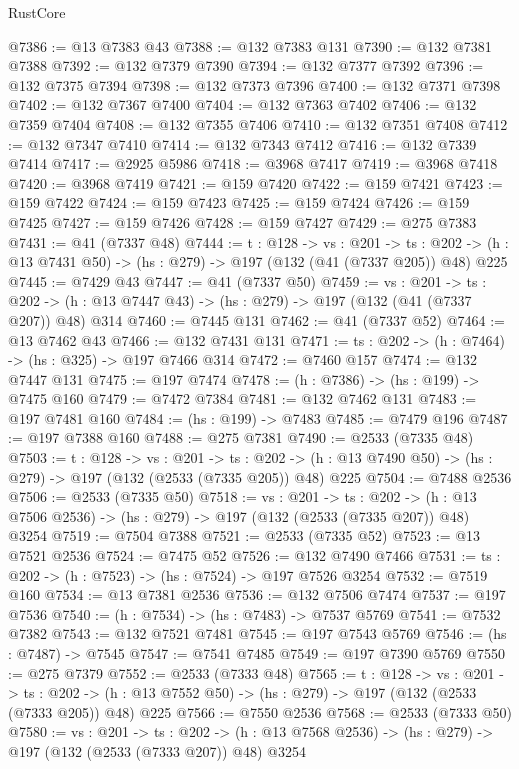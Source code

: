 \begin{lexlean}{RustCore}
\begin{coremodule}
@7386 := @13 @7383 @43
@7388 := @132 @7383 @131
@7390 := @132 @7381 @7388
@7392 := @132 @7379 @7390
@7394 := @132 @7377 @7392
@7396 := @132 @7375 @7394
@7398 := @132 @7373 @7396
@7400 := @132 @7371 @7398
@7402 := @132 @7367 @7400
@7404 := @132 @7363 @7402
@7406 := @132 @7359 @7404
@7408 := @132 @7355 @7406
@7410 := @132 @7351 @7408
@7412 := @132 @7347 @7410
@7414 := @132 @7343 @7412
@7416 := @132 @7339 @7414
@7417 := @2925 @5986
@7418 := @3968 @7417
@7419 := @3968 @7418
@7420 := @3968 @7419
@7421 := @159 @7420
@7422 := @159 @7421
@7423 := @159 @7422
@7424 := @159 @7423
@7425 := @159 @7424
@7426 := @159 @7425
@7427 := @159 @7426
@7428 := @159 @7427
@7429 := @275 @7383
@7431 := @41 (@7337 @48)
@7444 := {t : @128} ->
  {vs : @201} ->
  {ts : @202} -> (h : @13 @7431 @50) -> (hs : @279) -> @197 (@132 (@41 (@7337 @205)) @48) @225
@7445 := @7429 @43
@7447 := @41 (@7337 @50)
@7459 := {vs : @201} ->
  {ts : @202} -> (h : @13 @7447 @43) -> (hs : @279) -> @197 (@132 (@41 (@7337 @207)) @48) @314
@7460 := @7445 @131
@7462 := @41 (@7337 @52)
@7464 := @13 @7462 @43
@7466 := @132 @7431 @131
@7471 := {ts : @202} -> (h : @7464) -> (hs : @325) -> @197 @7466 @314
@7472 := @7460 @157
@7474 := @132 @7447 @131
@7475 := @197 @7474
@7478 := (h : @7386) -> (hs : @199) -> @7475 @160
@7479 := @7472 @7384
@7481 := @132 @7462 @131
@7483 := @197 @7481 @160
@7484 := (hs : @199) -> @7483
@7485 := @7479 @196
@7487 := @197 @7388 @160
@7488 := @275 @7381
@7490 := @2533 (@7335 @48)
@7503 := {t : @128} ->
  {vs : @201} ->
  {ts : @202} -> (h : @13 @7490 @50) -> (hs : @279) -> @197 (@132 (@2533 (@7335 @205)) @48) @225
@7504 := @7488 @2536
@7506 := @2533 (@7335 @50)
@7518 := {vs : @201} ->
  {ts : @202} -> (h : @13 @7506 @2536) -> (hs : @279) -> @197 (@132 (@2533 (@7335 @207)) @48) @3254
@7519 := @7504 @7388
@7521 := @2533 (@7335 @52)
@7523 := @13 @7521 @2536
@7524 := @7475 @52
@7526 := @132 @7490 @7466
@7531 := {ts : @202} -> (h : @7523) -> (hs : @7524) -> @197 @7526 @3254
@7532 := @7519 @160
@7534 := @13 @7381 @2536
@7536 := @132 @7506 @7474
@7537 := @197 @7536
@7540 := (h : @7534) -> (hs : @7483) -> @7537 @5769
@7541 := @7532 @7382
@7543 := @132 @7521 @7481
@7545 := @197 @7543 @5769
@7546 := (hs : @7487) -> @7545
@7547 := @7541 @7485
@7549 := @197 @7390 @5769
@7550 := @275 @7379
@7552 := @2533 (@7333 @48)
@7565 := {t : @128} ->
  {vs : @201} ->
  {ts : @202} -> (h : @13 @7552 @50) -> (hs : @279) -> @197 (@132 (@2533 (@7333 @205)) @48) @225
@7566 := @7550 @2536
@7568 := @2533 (@7333 @50)
@7580 := {vs : @201} ->
  {ts : @202} -> (h : @13 @7568 @2536) -> (hs : @279) -> @197 (@132 (@2533 (@7333 @207)) @48) @3254

\end{coremodule}
\end{lexlean}
